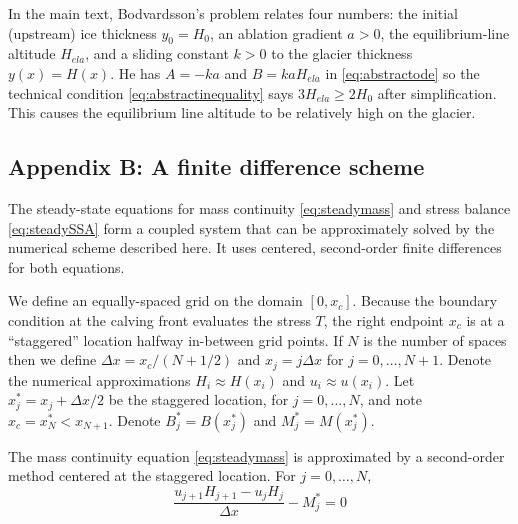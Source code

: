 \documentclass[review,letterpaper]{igs}
\begin{document}
In the main text, Bodvardsson's problem relates four numbers: the initial (upstream) ice thickness $y_0=H_0$, an ablation gradient $a>0$, the equilibrium-line altitude $H_{ela}$, and a sliding constant $k>0$ to the glacier thickness $y(x) = H(x)$.  He has $A=-ka$ and $B=k a H_{ela}$ in \eqref{eq:abstractode} so the technical condition \eqref{eq:abstractinequality} says $3 H_{ela} \ge 2 H_0$ after simplification.  This causes the equilibrium line altitude to be relatively high on the glacier.


\subsection{Appendix B: A finite difference scheme}  The steady-state equations for mass continuity \eqref{eq:steadymass} and stress balance \eqref{eq:steadySSA} form a coupled system that can be approximately solved by the numerical scheme described here.  It uses centered, second-order finite differences for both equations.

We define an equally-spaced grid on the domain $[0,x_c]$.  Because the boundary condition at the calving front evaluates the stress $T$, the right endpoint $x_c$ is at a ``staggered'' location halfway in-between grid points.  If $N$ is the number of spaces then we define $\Delta x = x_c / (N+1/2)$ and $x_j = j\Delta x$ for $j=0,\dots,N+1$.  Denote the numerical approximations $H_i\approx H(x_i)$ and $u_i \approx u(x_i)$.  Let $x_j^* = x_j + \Delta x/2$ be the staggered location, for $j=0,\dots,N$, and note $x_c = x_N^* < x_{N+1}$.  Denote $B_j^*=B(x_j^*)$ and $M_j^*=M(x_j^*)$.

The mass continuity equation \eqref{eq:steadymass} is approximated by a second-order method centered at the staggered location.  For $j=0,\dots,N$,
\begin{equation}
\frac{u_{j+1} H_{j+1} - u_j H_j}{\Delta x} - M_j^* = 0 \label{eq:steadymassFD}
\end{equation}
\end{document}
